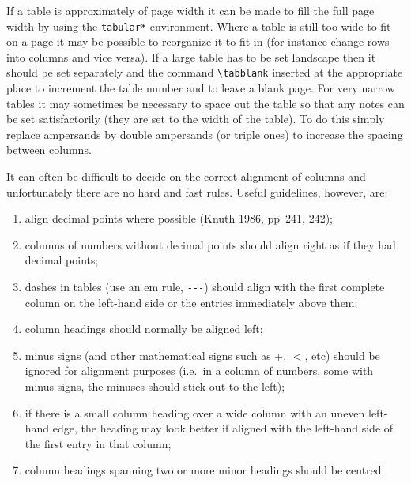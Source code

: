If a table is approximately of page width 
it can be made to fill the 
full page width by using the \verb"tabular*" environment.
Where a table is still too wide to fit on a page it may be possible to 
reorganize it to fit in (for instance change rows into columns and 
vice versa). If a large table has to be 
set landscape then it should 
be set separately and the command \verb"\tabblank" inserted at the 
appropriate place to increment the table number and to leave a blank 
page. For very narrow tables it may sometimes be necessary to space 
out the table so that any notes can be set satisfactorily (they are set 
to the width of the table). To do this simply replace ampersands by 
double ampersands (or triple ones) to increase the spacing between 
columns.
 
It can often be difficult to decide on the correct 
alignment of 
columns and unfortunately there are no hard and fast rules. Useful 
guidelines, however, are:
\begin{enumerate}
\item align decimal points where possible (Knuth 1986, 
pp~241, 242);

\item columns of numbers without decimal points should align right as 
if they had decimal points;

\item dashes in tables (use an em rule, \verb"---") 
should align with the first complete column on the 
left-hand side or the entries immediately above them;

\item column headings should normally be aligned left;

\item minus signs (and other mathematical signs such as +, $<$, etc) 
should be ignored for alignment purposes (i.e.\ in a 
column of numbers, some with minus signs, the minuses should stick out 
to the left); 

\item if there is a small column heading over a wide column with an 
uneven left-hand edge, the heading may look better if aligned with the 
left-hand side of the first entry in that column;

\item column headings spanning two or more minor headings should be 
centred.
\end{enumerate}

